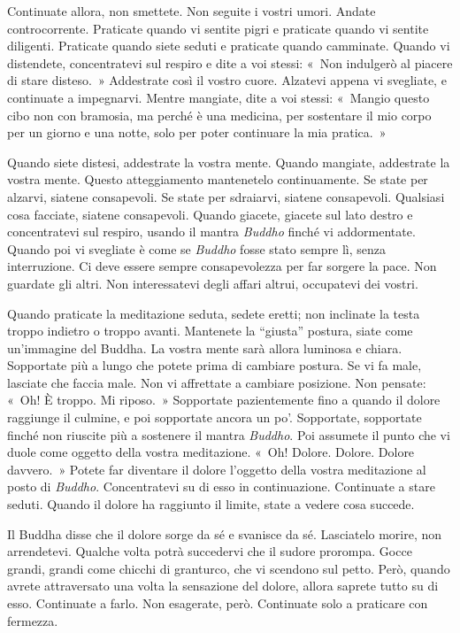 Continuate allora, non smettete. Non seguite i vostri umori. Andate
controcorrente. Praticate quando vi sentite pigri e praticate quando vi
sentite diligenti. Praticate quando siete seduti e praticate quando
camminate. Quando vi distendete, concentratevi sul respiro e dite a voi
stessi: «~Non indulgerò al piacere di stare disteso.~» Addestrate così
il vostro cuore. Alzatevi appena vi svegliate, e continuate a
impegnarvi. Mentre mangiate, dite a voi stessi: «~Mangio questo cibo non
con bramosia, ma perché è una medicina, per sostentare il mio corpo per
un giorno e una notte, solo per poter continuare la mia pratica.~»

Quando siete distesi, addestrate la vostra mente. Quando mangiate,
addestrate la vostra mente. Questo atteggiamento mantenetelo
continuamente. Se state per alzarvi, siatene consapevoli. Se state per
sdraiarvi, siatene consapevoli. Qualsiasi cosa facciate, siatene
consapevoli. Quando giacete, giacete sul lato destro e concentratevi sul
respiro, usando il mantra \emph{Buddho} finché vi addormentate. Quando
poi vi svegliate è come se \emph{Buddho} fosse stato sempre lì, senza
interruzione. Ci deve essere sempre consapevolezza per far sorgere la
pace. Non guardate gli altri. Non interessatevi degli affari altrui,
occupatevi dei vostri.

Quando praticate la meditazione seduta, sedete eretti; non inclinate la
testa troppo indietro o troppo avanti. Mantenete la ``giusta'' postura,
siate come un'immagine del Buddha. La vostra mente sarà allora luminosa
e chiara. Sopportate più a lungo che potete prima di cambiare postura.
Se vi fa male, lasciate che faccia male. Non vi affrettate a cambiare
posizione. Non pensate: «~Oh! È troppo. Mi riposo.~» Sopportate
pazientemente fino a quando il dolore raggiunge il culmine, e poi
sopportate ancora un po'. Sopportate, sopportate finché non riuscite più
a sostenere il mantra \emph{Buddho}. Poi assumete il punto che vi duole
come oggetto della vostra meditazione. «~Oh! Dolore. Dolore. Dolore
davvero.~» Potete far diventare il dolore l'oggetto della vostra
meditazione al posto di \emph{Buddho}. Concentratevi su di esso in
continuazione. Continuate a stare seduti. Quando il dolore ha raggiunto
il limite, state a vedere cosa succede.

Il Buddha disse che il dolore sorge da sé e svanisce da sé. Lasciatelo
morire, non arrendetevi. Qualche volta potrà succedervi che il sudore
prorompa. Gocce grandi, grandi come chicchi di granturco, che vi
scendono sul petto. Però, quando avrete attraversato una volta la
sensazione del dolore, allora saprete tutto su di esso. Continuate a
farlo. Non esagerate, però. Continuate solo a praticare con fermezza.

